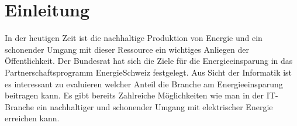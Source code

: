 \chapter{Einleitung}


In der heutigen Zeit ist die nachhaltige Produktion von Energie und ein schonender Umgang mit dieser Ressource ein wichtiges Anliegen der Öffentlichkeit. Der Bundesrat hat sich die Ziele für die Energieeinsparung in das Partnerschaftsprogramm EnergieSchweiz festgelegt. Aus Sicht der Informatik ist es interessant zu evaluieren welcher Anteil die Branche am Energieeinsparung beitragen kann. Es gibt bereits Zahlreiche Möglichkeiten wie man in der IT-Branche ein nachhaltiger und schonender Umgang mit elektrischer Energie erreichen kann.












